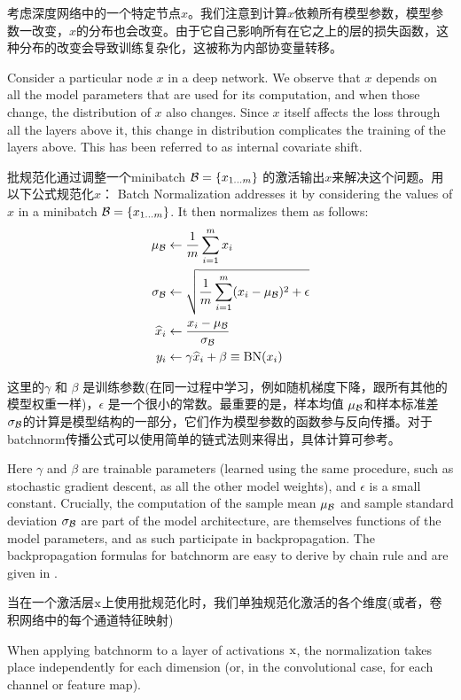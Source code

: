 考虑深度网络中的一个特定节点$x$。我们注意到计算$x$依赖所有模型参数，模型参数一改变，$x$的分布也会改变。由于它自己影响所有在它之上的层的损失函数，这种分布的改变会导致训练复杂化，这被称为内部协变量转移。

Consider a particular node $x$ in a deep network. We observe that $x$ depends on all the model parameters that are used for its computation, and when those change, the distribution of $x$ also changes. Since $x$ itself affects the loss through all the layers above it, this change in distribution complicates the training of the layers above. This has been referred to as internal covariate shift.

批规范化通过调整一个minibatch $\mathcal{B}=\{x_{1\ldots m}\}$ 的激活输出$x$来解决这个问题。用以下公式规范化$x$：
Batch Normalization \cite{batchnorm} addresses it by considering the values of $x$ in a minibatch $\mathcal{B}=\{x_{1\ldots m}\}$. It then normalizes them as follows:
\begin{align*}
    \mu_{\mathcal{B}} &\leftarrow \frac{1}{m}\sum_{i=1}^m x_i\\
  \sigma_{\mathcal{B}} &\leftarrow  \sqrt{\frac{1}{m}\sum_{i=1}^m (x_i-\mu_{\mathcal{B}})^2+\epsilon}\\
\widehat{x}_i &\leftarrow \frac{x_i-\mu_{\mathcal{B}}}{\sigma_{\mathcal{B}}}
\\
  y_i &\leftarrow \gamma\widehat{x}_i + \beta  \equiv \text{BN}(x_i)
\end{align*}

这里的$\gamma$ 和 $\beta$ 是训练参数(在同一过程中学习，例如随机梯度下降，跟所有其他的模型权重一样)，$\epsilon$ 是一个很小的常数。最重要的是，样本均值 $\mu_{\mathcal{B}}$和样本标准差$\sigma_{\mathcal{B}}$的计算是模型结构的一部分，它们作为模型参数的函数参与反向传播。对于batchnorm传播公式可以使用简单的链式法则来得出，具体计算可参考\cite{batchnorm}。

Here $\gamma$ and $\beta$ are trainable parameters (learned using the same procedure, such as stochastic gradient descent, as all the other model weights), and $\epsilon$ is a small constant. Crucially, the computation of the sample mean $\mu_{\mathcal{B}}$ and sample standard deviation $\sigma_{\mathcal{B}}$ are part of the model architecture, are themselves functions of the model parameters, and as such participate in backpropagation. The backpropagation formulas for batchnorm are easy to derive by chain rule and are given in \cite{batchnorm}.

当在一个激活层$\mathrm{x}$上使用批规范化时，我们单独规范化激活的各个维度(或者，卷积网络中的每个通道特征映射)

When applying batchnorm to a layer of activations $\mathrm{x}$, the normalization takes place independently for each dimension (or, in the convolutional case, for each channel or feature map).

